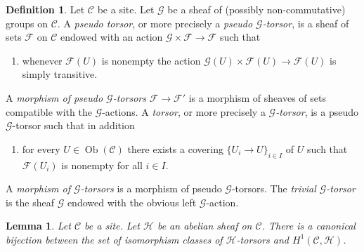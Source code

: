 \documentclass[10pt,a4paper]{amsart}
\theoremstyle{plain}
\newtheorem{lemma}[subsection]{Lemma}
\theoremstyle{definition}
\newtheorem{definition}[subsection]{Definition}
\theoremstyle{remark}
\numberwithin{equation}{subsection}
\def\Ob{\mathop{\mathrm{Ob}}\nolimits}
\begin{document}
\begin{definition}
\label{definition-torsor}
Let $\mathcal{C}$ be a site.
Let $\mathcal{G}$ be a sheaf of (possibly non-commutative)
groups on $\mathcal{C}$.
A {\it pseudo torsor}, or more precisely a
{\it pseudo $\mathcal{G}$-torsor}, is a sheaf
of sets $\mathcal{F}$ on $\mathcal{C}$ endowed with an action
$\mathcal{G} \times \mathcal{F} \to \mathcal{F}$ such that
\begin{enumerate}
\item whenever $\mathcal{F}(U)$ is nonempty the action
$\mathcal{G}(U) \times \mathcal{F}(U) \to \mathcal{F}(U)$
is simply transitive.
\end{enumerate}
A {\it morphism of pseudo $\mathcal{G}$-torsors}
$\mathcal{F} \to \mathcal{F}'$
is a morphism of sheaves of sets compatible with the
$\mathcal{G}$-actions.
A {\it torsor}, or more precisely a
{\it $\mathcal{G}$-torsor}, is a pseudo $\mathcal{G}$-torsor such that
in addition
\begin{enumerate}
\item[(2)] for every $U \in \Ob(\mathcal{C})$
there exists a covering $\{U_i \to U\}_{i \in I}$ of $U$
such that $\mathcal{F}(U_i)$ is nonempty for all $i \in I$.
\end{enumerate}
A {\it morphism of $\mathcal{G}$-torsors} is a morphism of
pseudo $\mathcal{G}$-torsors.
The {\it trivial $\mathcal{G}$-torsor}
is the sheaf $\mathcal{G}$ endowed with the obvious left
$\mathcal{G}$-action.
\end{definition}

\begin{lemma}
\label{lemma-torsors-h1}
Let $\mathcal{C}$ be a site.
Let $\mathcal{H}$ be an abelian sheaf on $\mathcal{C}$.
There is a canonical bijection between the set of isomorphism
classes of $\mathcal{H}$-torsors and $H^1(\mathcal{C}, \mathcal{H})$.
\end{lemma}
\end{document}
